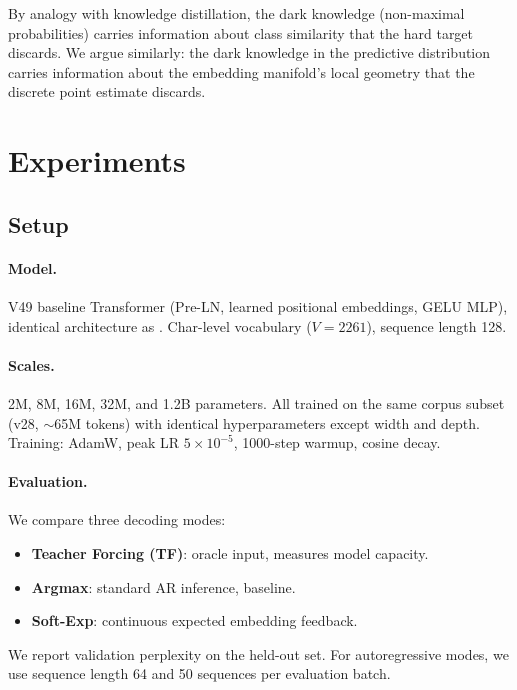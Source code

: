 \documentclass{article}
\begin{document}
By analogy with knowledge distillation, the dark knowledge (non-maximal probabilities) carries information about class similarity that the hard target discards. We argue similarly: the dark knowledge in the predictive distribution carries information about the embedding manifold's local geometry that the discrete point estimate discards.

\section{Experiments}

\subsection{Setup}

\paragraph{Model.} V49 baseline Transformer (Pre-LN, learned positional embeddings, GELU MLP), identical architecture as \citet{v49scale}. Char-level vocabulary ($V=2261$), sequence length 128.

\paragraph{Scales.} 2M, 8M, 16M, 32M, and 1.2B parameters. All trained on the same corpus subset (v28, $\sim$65M tokens) with identical hyperparameters except width and depth. Training: AdamW, peak LR $5 \times 10^{-5}$, 1000-step warmup, cosine decay.

\paragraph{Evaluation.} We compare three decoding modes:
\begin{itemize}
    \item \textbf{Teacher Forcing (TF)}: oracle input, measures model capacity.
    \item \textbf{Argmax}: standard AR inference, baseline.
    \item \textbf{Soft-Exp}: continuous expected embedding feedback.
\end{itemize}
We report validation perplexity on the held-out set. For autoregressive modes, we use sequence length 64 and 50 sequences per evaluation batch.
\end{document}
